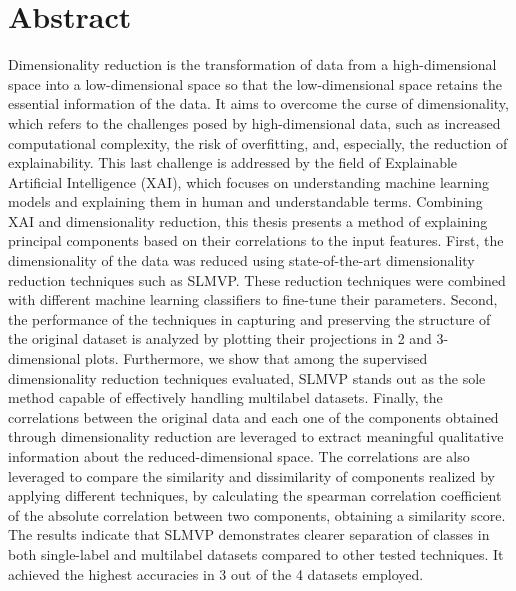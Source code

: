 

\newpage

\chapter*{Abstract}

Dimensionality reduction is the transformation of data from a high-dimensional space into a low-dimensional space so that the low-dimensional space retains the essential information of the data. It aims to overcome the curse of dimensionality, which refers to the challenges posed by high-dimensional data, such as increased computational complexity, the risk of overfitting, and, especially, the reduction of explainability.
This last challenge is addressed by the field of Explainable Artificial Intelligence (XAI), which focuses on understanding machine learning models and explaining them in human and understandable terms. Combining XAI and dimensionality reduction, this thesis presents a method of explaining principal components based on their correlations to the input features.
First, the dimensionality of the data was reduced using state-of-the-art dimensionality reduction techniques such as SLMVP. These reduction techniques were combined with different machine learning classifiers to fine-tune their parameters.
Second, the performance of the techniques in capturing and preserving the structure of the original dataset is analyzed by plotting their projections in 2 and 3-dimensional plots.
Furthermore, we show that among the supervised dimensionality reduction techniques evaluated, SLMVP stands out as the sole method capable of effectively handling multilabel datasets.
Finally, the correlations between the original data and each one of the components obtained through dimensionality reduction  are leveraged to extract meaningful qualitative information about the reduced-dimensional space.
The correlations are also leveraged to compare the similarity and dissimilarity of components realized by applying different techniques, by calculating the spearman correlation coefficient of the absolute correlation between two components, obtaining a similarity score.
The results indicate that SLMVP demonstrates clearer separation of classes in both single-label and multilabel datasets compared to other tested techniques. It achieved the highest accuracies in 3 out of the 4 datasets employed.

